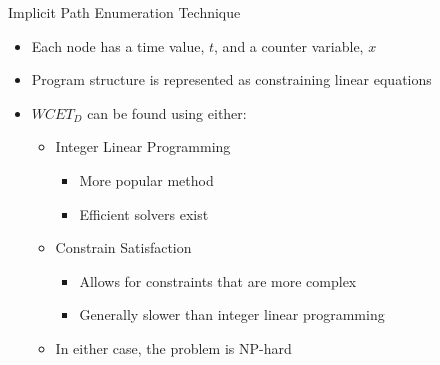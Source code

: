 \documentclass{beamer}
\begin{document}
\begin{frame}[IPET]{Implicit Path Enumeration Technique}
  \begin{itemize}
    \item Each node has a time value, $t$, and a counter variable, $x$
    \item Program structure is represented as constraining linear equations
    \item $WCET_D$ can be found using either:
      \begin{itemize}
      \item Integer Linear Programming
        \begin{itemize}
          \item More popular method
          \item Efficient solvers exist
        \end{itemize}
      \item Constrain Satisfaction
        \begin{itemize}
          \item Allows for constraints that are more complex
          \item Generally slower than integer linear programming
        \end{itemize}
      \item In either case, the problem is NP-hard
      \end{itemize}
  \end{itemize}
\end{frame}
\end{document}
